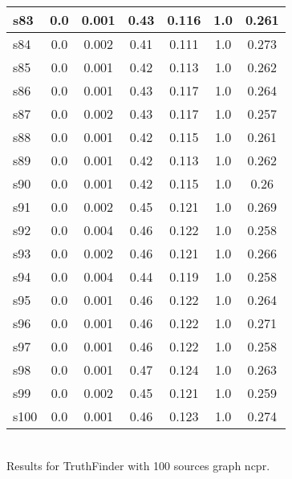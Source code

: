 \documentclass{article}
\begin{document}
\begin{tabular}{|l|c|c|c|c|c|c|}
\hline
s83 &0.0 & 0.001 & 0.43 & 0.116 & 1.0 & 0.261\\
\hline
s84 &0.0 & 0.002 & 0.41 & 0.111 & 1.0 & 0.273\\
\hline
s85 &0.0 & 0.001 & 0.42 & 0.113 & 1.0 & 0.262\\
\hline
s86 &0.0 & 0.001 & 0.43 & 0.117 & 1.0 & 0.264\\
\hline
s87 &0.0 & 0.002 & 0.43 & 0.117 & 1.0 & 0.257\\
\hline
s88 &0.0 & 0.001 & 0.42 & 0.115 & 1.0 & 0.261\\
\hline
s89 &0.0 & 0.001 & 0.42 & 0.113 & 1.0 & 0.262\\
\hline
s90 &0.0 & 0.001 & 0.42 & 0.115 & 1.0 & 0.26\\
\hline
s91 &0.0 & 0.002 & 0.45 & 0.121 & 1.0 & 0.269\\
\hline
s92 &0.0 & 0.004 & 0.46 & 0.122 & 1.0 & 0.258\\
\hline
s93 &0.0 & 0.002 & 0.46 & 0.121 & 1.0 & 0.266\\
\hline
s94 &0.0 & 0.004 & 0.44 & 0.119 & 1.0 & 0.258\\
\hline
s95 &0.0 & 0.001 & 0.46 & 0.122 & 1.0 & 0.264\\
\hline
s96 &0.0 & 0.001 & 0.46 & 0.122 & 1.0 & 0.271\\
\hline
s97 &0.0 & 0.001 & 0.46 & 0.122 & 1.0 & 0.258\\
\hline
s98 &0.0 & 0.001 & 0.47 & 0.124 & 1.0 & 0.263\\
\hline
s99 &0.0 & 0.002 & 0.45 & 0.121 & 1.0 & 0.259\\
\hline
s100 &0.0 & 0.001 & 0.46 & 0.123 & 1.0 & 0.274\\
\hline
\end{tabular}\\

\noindent Results for TruthFinder with 100 sources graph ncpr.
\end{document}
